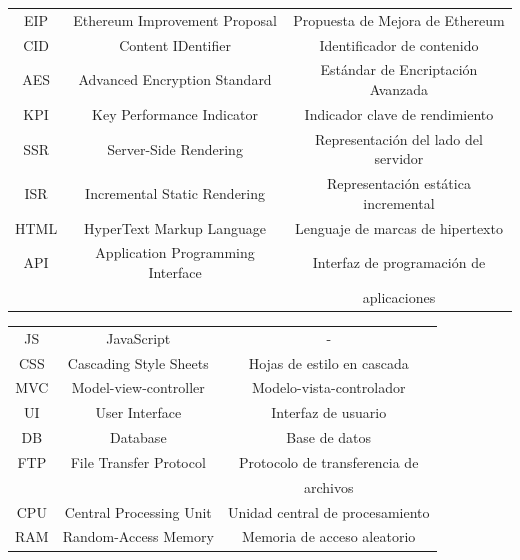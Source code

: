 \documentclass[a4paper,openright,11pt]{book}
\begin{document}
\begin{table}[H]
\begin{tabular}{ c  c  c }
        EIP     & Ethereum Improvement Proposal     & Propuesta de Mejora de Ethereum \\
        CID     & Content IDentifier                & Identificador de contenido \\
        AES     & Advanced Encryption Standard      & Estándar de Encriptación Avanzada \\
        KPI     & Key Performance Indicator         & Indicador clave de rendimiento \\
        SSR     & Server-Side Rendering             & Representación del lado del servidor \\
        ISR     & Incremental Static Rendering      & Representación estática incremental \\
        HTML    & HyperText Markup Language         & Lenguaje de marcas de hipertexto \\
        API     & Application Programming Interface & Interfaz de programación de \\
                &                                   & aplicaciones \\
    \end{tabular}
\end{table}
\begin{table}[ht!]
    \centering
    \begin{tabular}{c c c}
        JS      & JavaScript                        & - \\
        CSS     & Cascading Style Sheets            & Hojas de estilo en cascada \\
        MVC     & Model-view-controller             & Modelo-vista-controlador   \\
        UI      & User Interface                    & Interfaz de usuario \\
        DB      & Database                          & Base de datos \\
        FTP     & File Transfer Protocol            & Protocolo de transferencia de \\
                &                                   & archivos \\
        CPU     & Central Processing Unit           & Unidad central de procesamiento \\
        RAM     & Random-Access Memory              & Memoria de acceso aleatorio \\
    \end{tabular}
\end{table}
\newpage
\end{document}
